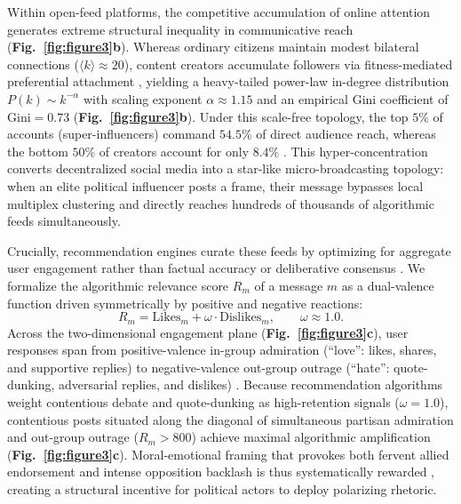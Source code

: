 \documentclass{article}
\begin{document}
Within open-feed platforms, the competitive accumulation of online attention generates extreme structural inequality in communicative reach (\textbf{Fig.~\ref{fig:figure3}b}). Whereas ordinary citizens maintain modest bilateral connections ($\langle k \rangle \approx 20$), content creators accumulate followers via fitness-mediated preferential attachment \citep{barabasi1999emergence, bianconi2001competition}, yielding a heavy-tailed power-law in-degree distribution $P(k) \sim k^{-\alpha}$ with scaling exponent $\alpha \approx 1.15$ and an empirical Gini coefficient of $\mathrm{Gini} = 0.73$ (\textbf{Fig.~\ref{fig:figure3}b}). Under this scale-free topology, the top $5\%$ of accounts (super-influencers) command $54.5\%$ of direct audience reach, whereas the bottom $50\%$ of creators account for only $8.4\%$ \citep{bakshy2011everyone}. This hyper-concentration converts decentralized social media into a star-like micro-broadcasting topology: when an elite political influencer posts a frame, their message bypasses local multiplex clustering and directly reaches hundreds of thousands of algorithmic feeds simultaneously.

Crucially, recommendation engines curate these feeds by optimizing for aggregate user engagement rather than factual accuracy or deliberative consensus \citep{vosoughi2018spread, crockett2017moral}. We formalize the algorithmic relevance score $R_m$ of a message $m$ as a dual-valence function driven symmetrically by positive and negative reactions:
\begin{equation}
    R_m = \mathrm{Likes}_m + \omega \cdot \mathrm{Dislikes}_m, \qquad \omega \approx 1.0.
    \label{eq:algorithmic_relevance}
\end{equation}
Across the two-dimensional engagement plane (\textbf{Fig.~\ref{fig:figure3}c}), user responses span from positive-valence in-group admiration (``love'': likes, shares, and supportive replies) to negative-valence out-group outrage (``hate'': quote-dunking, adversarial replies, and dislikes) \citep{brady2017emotion}. Because recommendation algorithms weight contentious debate and quote-dunking as high-retention signals ($\omega = 1.0$), contentious posts situated along the diagonal of simultaneous partisan admiration and out-group outrage ($R_m > 800$) achieve maximal algorithmic amplification (\textbf{Fig.~\ref{fig:figure3}c}). Moral-emotional framing that provokes both fervent allied endorsement and intense opposition backlash is thus systematically rewarded \citep{brady2017emotion, crockett2017moral}, creating a structural incentive for political actors to deploy polarizing rhetoric.
\end{document}
